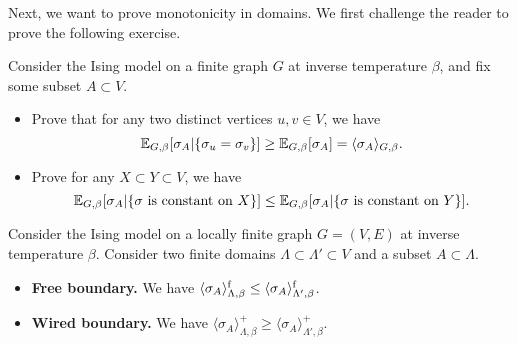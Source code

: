 Next, we want to prove monotonicity in domains.
We first challenge the reader to prove the following exercise.


\begin{exercise}
    \label{exo:conditioning_equality}
    Consider the Ising model on a finite graph $G$
    at inverse temperature $\beta$, and fix some subset $A\subset V$.
    \begin{itemize}
        \item     Prove that for any two distinct vertices $u,v\in V$,
        we have
        \[
            \mathbb E_{G,\beta}[\sigma_A|\{\sigma_u=\sigma_v\}]
            \geq
            \mathbb E_{G,\beta}[\sigma_A]=\langle\sigma_A\rangle_{G,\beta}.
        \]
        \item Prove for any $X\subset Y\subset V$, we have
        \[
            \E_{G,\beta}[\sigma_A|\{\text{$\sigma$ is constant on $X$}\}]
            \leq
            \E_{G,\beta}[\sigma_A|\{\text{$\sigma$ is constant on $Y$}\}]
            .
        \]
    \end{itemize}
\end{exercise}

\begin{lemma}
    \label{lemma:correlation_functions_monotone_both}
    Consider the Ising model on a locally finite graph
    $G=(V,E)$ at inverse temperature $\beta$.
    Consider two finite domains $\Lambda\subset\Lambda'\subset V$
    and a subset $A\subset \Lambda$.
    \begin{itemize}
        \item \textbf{Free boundary.}
        We have $\langle\sigma_A\rangle^{\operatorname{f}}_{\Lambda,\beta}\leq\langle\sigma_A\rangle^{\operatorname{f}}_{\Lambda',\beta}$.
        \item \textbf{Wired boundary.}
        We have $\langle\sigma_A\rangle^+_{\Lambda,\beta}\geq\langle\sigma_A\rangle^+_{\Lambda',\beta}$.
    \end{itemize}
\end{lemma}

